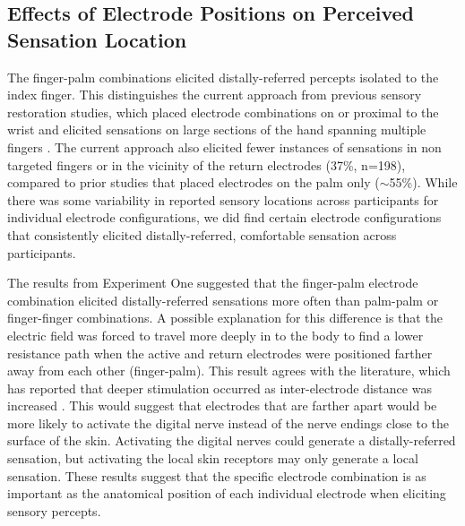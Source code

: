 \documentclass[10pt]{iopart}
\begin{document}
\subsection{Effects of Electrode Positions on Perceived Sensation Location}

The finger-palm combinations elicited distally-referred percepts isolated to the index finger. This distinguishes the current approach from previous sensory restoration studies, which placed electrode combinations on or proximal to the wrist and elicited sensations on large sections of the hand spanning multiple fingers \cite{slopsema_natural_2018, pena_channel-hopping_2021}. The current approach also elicited fewer instances of sensations in non targeted fingers or in the vicinity of the return electrodes (37\%, n=198), compared to prior studies that placed electrodes on the palm only ($\sim$55\%)\cite{dalonzo_electro-cutaneous_2018}. While there was some variability in reported sensory locations across participants for individual electrode configurations, we did find certain electrode configurations that consistently elicited distally-referred, comfortable sensation across participants.

The results from Experiment One suggested that the finger-palm electrode combination elicited distally-referred sensations more often than palm-palm or finger-finger combinations. A possible explanation for this difference is that the electric field was forced to travel more deeply in to the body to find a lower resistance path when the active and return electrodes were positioned farther away from each other (finger-palm). This result agrees with the literature, which has reported that deeper stimulation occurred as inter-electrode distance was increased \cite{gomez-tames_simulation_2012, kajimoto_electro-tactile_2016}. This would suggest that electrodes that are farther apart would be more likely to activate the digital nerve instead of the nerve endings close to the surface of the skin. Activating the digital nerves could generate a distally-referred sensation, but activating the local skin receptors may only generate a local sensation. These results suggest that the specific electrode combination is as important as the anatomical position of each individual electrode when eliciting sensory percepts.
\end{document}
